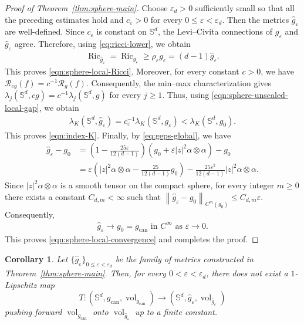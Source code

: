 \documentclass[11pt,reqno]{amsart}
\numberwithin{equation}{section}
\newtheorem{cor}[thm]{Corollary}
\theoremstyle{definition}
\theoremstyle{remark}
\def\cR {\mathcal{R}}
\newcommand{\lam}{\lambda}
\newcommand{\0}{\emptyset}
\newcommand{\veps}{\varepsilon}
\newcommand{\bbS}{\mathbb S}
\newcommand{\Ric}{\operatorname{Ric}}
\newcommand{\can}{\mathrm{can}}
\newcommand{\vol}{\operatorname{vol}}
\newcommand{\dvol}{\,\mathrm{dvol}}
\begin{document}
\begin{proof}[Proof of Theorem~\ref{thm:sphere-main}]
Choose $\veps_d>0$ sufficiently small so that all the preceding estimates
hold and $c_\veps>0$ for every $0\leq\veps<\veps_d$. Then the metrics
$\widehat g_\veps$ are well-defined. Since $c_\veps$ is constant on
$\bbS^d$, the Levi--Civita connections of $g_\veps$ and
$\widehat g_\veps$ agree. Therefore, using
\eqref{eq:ricci-lower}, we obtain
\begin{align}
        \Ric_{\widehat g_\veps}
        =
        \Ric_{g_\veps}\geq
        \rho_\veps g_\veps=
        (d-1)\widehat g_\veps.
\end{align}
This proves \eqref{eqn:sphere-local-Ricci}. Moreover, for every constant $c>0$, we have $ \cR_{cg}(f)=c^{-1}\cR_g(f).$ 
Consequently, the min--max characterization gives
$\lam_j(\bbS^d,cg)=c^{-1}\lam_j(\bbS^d,g)$ for every $j\geq1$. Thus,
using \eqref{eqn:sphere-unscaled-local-gap}, we obtain
\begin{align}
        \lam_K(\bbS^d,\widehat g_\veps)
        =
        c_\veps^{-1}\lam_K(\bbS^d,g_\veps)<
        \lam_K(\bbS^d,g_0).
\end{align}
This proves \eqref{eqn:index-K}. Finally, by \eqref{eq:geps-global}, we have
\begin{align}
        \widehat g_\veps-g_0
        &=
        \left(
        1-\frac{25\veps}{12(d-1)}
        \right)
        \left(
        g_0+\veps |z|^2\alpha\otimes\alpha
        \right)
        -g_0\\
        &=
        \veps
        \left(
        |z|^2\alpha\otimes\alpha
        -\frac{25}{12(d-1)}g_0
        \right)
        -
        \frac{25\veps^2}{12(d-1)}
        |z|^2\alpha\otimes\alpha.
\end{align}
Since $|z|^2\alpha\otimes\alpha$ is a smooth tensor on the compact sphere,
for every integer $m\geq0$ there exists a constant $C_{d,m}<\infty$ such
that $\left\|
        \widehat g_\veps-g_0
        \right\|_{C^m(g_0)}
        \leq
        C_{d,m}\veps.$
Consequently,
\begin{align}
        \widehat g_\veps
        \rightarrow
        g_0
        =
        g_\can
         \text{ in }C^\infty
        \text{ as }\veps\to0.
\end{align}
This proves \eqref{eqn:sphere-local-convergence} and completes the proof.
\end{proof}
\begin{cor}\label{cor:sphere}
Let $\{\widehat g_\veps\}_{0\leq\veps<\veps_d}$ be the family of metrics
constructed in Theorem~\ref{thm:sphere-main}. Then, for every
$0<\veps<\veps_d$, there does not exist a $1$-Lipschitz map
\[
        T:
        (\bbS^d,g_\can,\vol_{g_\can})
        \to
        (\bbS^d,\widehat g_\veps,\vol_{\widehat g_\veps})
\]
pushing forward $\vol_{g_\can}$ onto $\vol_{\widehat g_\veps}$ up to a
finite constant.
\end{cor}
\end{document}
